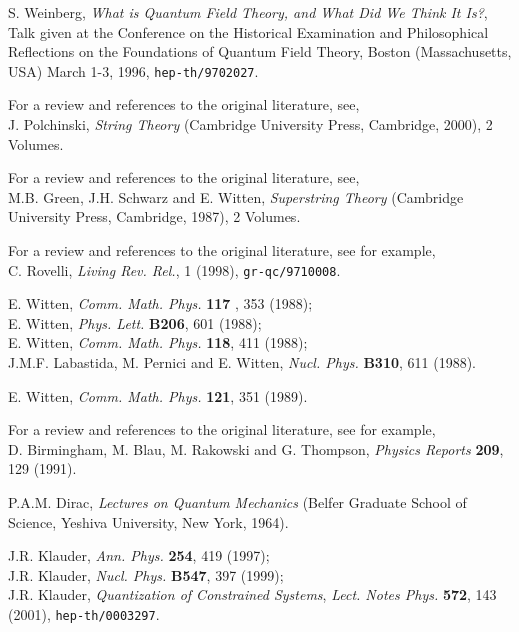\documentclass[a4paper,11pt]{article}
\begin{document}
\begin{thebibliography}{99}

 S. Weinberg, {\sl What is Quantum Field Theory, and What
Did We Think It Is?\/}, Talk given at the Conference on the Historical 
Examination and Philosophical Reflections on the Foundations of Quantum 
Field Theory, Boston (Massachusetts, USA)  March 1-3, 1996, 
{\tt hep-th/9702027}.

 For a review and references to the original literature, see,\\
J. Polchinski, {\sl String Theory\/} (Cambridge University Press,
Cambridge, 2000), 2 Volumes.

 For a review and references to the original literature, see,\\
M.B. Green, J.H. Schwarz and E. Witten, {\sl Superstring Theory\/}
(Cambridge University Press, Cambridge, 1987), 2 Volumes.

 For a review and references to the original literature, see for
example,\\
C. Rovelli, {\em Living Rev. Rel.\/}, 1 (1998), {\tt gr-qc/9710008}.

 E. Witten, {\em Comm. Math. Phys.\/} {\bf 117} , 353 (1988);\\
E. Witten, {\em Phys. Lett.\/} {\bf B206}, 601 (1988);\\
E. Witten, {\em Comm. Math. Phys.\/} {\bf 118}, 411 (1988);\\
J.M.F. Labastida, M. Pernici and E. Witten, {\em Nucl. Phys.\/} {\bf B310}, 
611 (1988).

 E. Witten, {\em Comm. Math. Phys.\/} {\bf 121}, 351 (1989).

 For a review and references to the original literature, see
for example,\\
D. Birmingham, M. Blau, M. Rakowski and G. Thompson, {\em Physics Reports\/}
{\bf 209}, 129 (1991).

 P.A.M. Dirac, {\sl Lectures on Quantum Mechanics\/} (Belfer
Graduate School of Science, Yeshiva University, New York, 1964).

J.R. Klauder, {\em Ann. Phys.\/} {\bf 254}, 419 (1997);\\
J.R. Klauder, {\em Nucl. Phys.\/} {\bf B547}, 397 (1999);\\
J.R. Klauder, {\sl Quantization of Constrained Systems\/},
{\sl Lect. Notes Phys.\/} {\bf 572}, 143 (2001), {\tt hep-th/0003297}.


\end{thebibliography}
\end{document}
